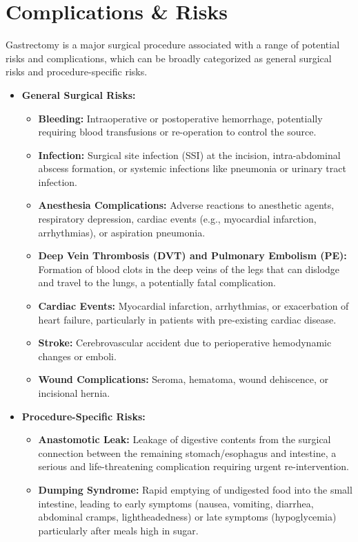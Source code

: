 \section*{Complications \& Risks}
Gastrectomy is a major surgical procedure associated with a range of potential risks and complications, which can be broadly categorized as general surgical risks and procedure-specific risks.

\begin{itemize}
  \item \textbf{General Surgical Risks:}
    \begin{itemize}
      \item \textbf{Bleeding:} Intraoperative or postoperative hemorrhage, potentially requiring blood transfusions or re-operation to control the source.
      \item \textbf{Infection:} Surgical site infection (SSI) at the incision, intra-abdominal abscess formation, or systemic infections like pneumonia or urinary tract infection.
      \item \textbf{Anesthesia Complications:} Adverse reactions to anesthetic agents, respiratory depression, cardiac events (e.g., myocardial infarction, arrhythmias), or aspiration pneumonia.
      \item \textbf{Deep Vein Thrombosis (DVT) and Pulmonary Embolism (PE):} Formation of blood clots in the deep veins of the legs that can dislodge and travel to the lungs, a potentially fatal complication.
      \item \textbf{Cardiac Events:} Myocardial infarction, arrhythmias, or exacerbation of heart failure, particularly in patients with pre-existing cardiac disease.
      \item \textbf{Stroke:} Cerebrovascular accident due to perioperative hemodynamic changes or emboli.
      \item \textbf{Wound Complications:} Seroma, hematoma, wound dehiscence, or incisional hernia.
    \end{itemize}
  \item \textbf{Procedure-Specific Risks:}
    \begin{itemize}
      \item \textbf{Anastomotic Leak:} Leakage of digestive contents from the surgical connection between the remaining stomach/esophagus and intestine, a serious and life-threatening complication requiring urgent re-intervention.
      \item \textbf{Dumping Syndrome:} Rapid emptying of undigested food into the small intestine, leading to early symptoms (nausea, vomiting, diarrhea, abdominal cramps, lightheadedness) or late symptoms (hypoglycemia) particularly after meals high in sugar.

\end{itemize}
\end{itemize}
